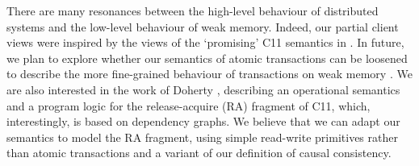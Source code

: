 There are many resonances between the high-level  behaviour
of distributed systems and the low-level behaviour  of weak
memory. Indeed, our partial client views were 
inspired by the views of  the `promising' C11 semantics in \cite{promises}. 
In future, we plan to explore whether our semantics of atomic transactions can be loosened to describe the more fine-grained behaviour of transactions on weak
memory \cite{PSI-RA,DBLP:conf/pldi/ChongSW18}. 
We are also interested in the work of Doherty \etal\citet{op-semantics-c11-rar}, describing an
operational semantics and a program logic for the release-acquire (RA) fragment of C11, which, interestingly, 
is based on dependency graphs. 
We believe that we can adapt our semantics to model the RA fragment, using simple read-write
primitives rather than atomic transactions and a variant of our definition of causal consistency.%
